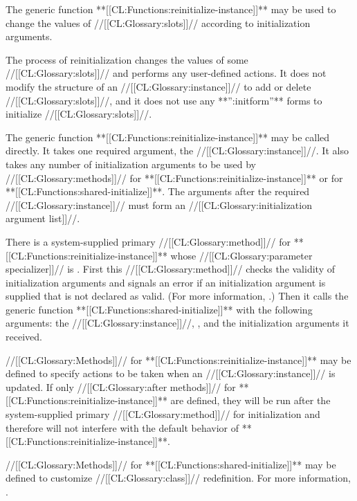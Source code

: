 
                      
The generic function **[[CL:Functions:reinitialize-instance]]** may be used to change
the values of //[[CL:Glossary:slots]]// according to initialization arguments.

The process of reinitialization changes the values of some //[[CL:Glossary:slots]]// and
performs any user-defined actions.  It does not modify the structure
of an //[[CL:Glossary:instance]]// to add or delete //[[CL:Glossary:slots]]//, 
and it does not use any **'':initform''** forms to initialize //[[CL:Glossary:slots]]//.

The generic function **[[CL:Functions:reinitialize-instance]]** may be called
directly.  It takes one required argument, the //[[CL:Glossary:instance]]//.  It also
takes any number of initialization arguments to be used by //[[CL:Glossary:methods]]// for
**[[CL:Functions:reinitialize-instance]]** or for **[[CL:Functions:shared-initialize]]**. The
arguments after the required //[[CL:Glossary:instance]]// must form an 
//[[CL:Glossary:initialization argument list]]//.
                                               
There is a system-supplied primary //[[CL:Glossary:method]]// for 
**[[CL:Functions:reinitialize-instance]]** whose //[[CL:Glossary:parameter specializer]]// is 
.  First this //[[CL:Glossary:method]]// checks the validity of
initialization arguments and signals an error if an initialization
argument is supplied that is not declared as valid. 
(For more information, \seesection\DeclaringInitargValidity.)
Then it calls the generic function 
**[[CL:Functions:shared-initialize]]** with the following arguments: the //[[CL:Glossary:instance]]//,
\nil, and the initialization arguments it received.


//[[CL:Glossary:Methods]]// for **[[CL:Functions:reinitialize-instance]]** may be defined to specify
actions to be taken when an //[[CL:Glossary:instance]]// is updated.  If only
//[[CL:Glossary:after methods]]// for **[[CL:Functions:reinitialize-instance]]** are defined, 
they will be run after the system-supplied primary //[[CL:Glossary:method]]// for 
initialization and therefore will not interfere with the default behavior of 
**[[CL:Functions:reinitialize-instance]]**.

//[[CL:Glossary:Methods]]// for **[[CL:Functions:shared-initialize]]** may be defined to customize 
//[[CL:Glossary:class]]// redefinition.  For more information, \seesection\SharedInitialize.

\endsubsection%

